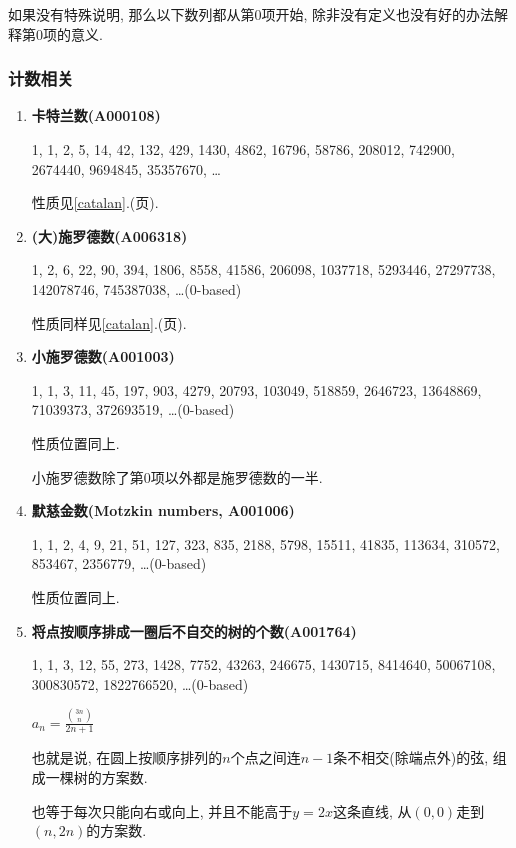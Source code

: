 如果没有特殊说明, 那么以下数列都从第$0$项开始, 除非没有定义也没有好的办法解释第$0$项的意义.

\subsubsection{计数相关}

\begin{enumerate}

\item \textbf{卡特兰数(A000108)}

1, 1, 2, 5, 14, 42, 132, 429, 1430, 4862, 16796, 58786, 208012, 742900, 2674440, 9694845, 35357670, \dots

性质见\ref{catalan}.(\pageref{catalan}页).

\item \textbf{(大)施罗德数(A006318)}

1, 2, 6, 22, 90, 394, 1806, 8558, 41586, 206098, 1037718, 5293446, 27297738, 142078746, 745387038, \dots \;(0-based)

性质同样见\ref{catalan}.(\pageref{catalan}页).

\item \textbf{小施罗德数(A001003)}

1, 1, 3, 11, 45, 197, 903, 4279, 20793, 103049, 518859, 2646723, 13648869, 71039373, 372693519, \dots \;(0-based)

性质位置同上.

小施罗德数除了第$0$项以外都是施罗德数的一半.

\item \textbf{默慈金数(Motzkin numbers, A001006)}

1, 1, 2, 4, 9, 21, 51, 127, 323, 835, 2188, 5798, 15511, 41835, 113634, 310572, 853467, 2356779, \dots \;(0-based)

性质位置同上.

\item \textbf{将点按顺序排成一圈后不自交的树的个数(A001764)}

1, 1, 3, 12, 55, 273, 1428, 7752, 43263, 246675, 1430715, 8414640, 50067108, 300830572, 1822766520, \dots \;(0-based)

$ a_n = \frac {{3n \choose n}} {2n + 1} $

也就是说, 在圆上按顺序排列的$n$个点之间连$n - 1$条不相交(除端点外)的弦, 组成一棵树的方案数.

也等于每次只能向右或向上, 并且不能高于$y = 2x$这条直线, 从$(0, 0)$走到$(n, 2n)$的方案数.


\end{enumerate}
